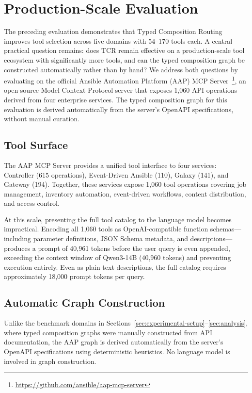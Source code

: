 \section{Production-Scale Evaluation}
\label{sec:production-eval}

The preceding evaluation demonstrates that Typed Composition Routing improves tool selection across five domains with 54--170 tools each.
A central practical question remains: does TCR remain effective on a production-scale tool ecosystem with significantly more tools, and can the typed composition graph be constructed automatically rather than by hand?
We address both questions by evaluating on the official Ansible Automation Platform (AAP) MCP Server~\footnote{\url{https://github.com/ansible/aap-mcp-server}}, an open-source Model Context Protocol server that exposes 1,060 API operations derived from four enterprise services.
The typed composition graph for this evaluation is derived automatically from the server's OpenAPI specifications, without manual curation.

\subsection{Tool Surface}
\label{sec:aap-tools}

The AAP MCP Server provides a unified tool interface to four services: Controller (615 operations), Event-Driven Ansible (110), Galaxy (141), and Gateway (194).
Together, these services expose 1,060 tool operations covering job management, inventory automation, event-driven workflows, content distribution, and access control.

At this scale, presenting the full tool catalog to the language model becomes impractical.
Encoding all 1,060 tools as OpenAI-compatible function schemas---including parameter definitions, JSON Schema metadata, and descriptions---produces a prompt of 40,961 tokens before the user query is even appended, exceeding the context window of Qwen3-14B (40,960 tokens) and preventing execution entirely.
Even as plain text descriptions, the full catalog requires approximately 18,000 prompt tokens per query.

\subsection{Automatic Graph Construction}
\label{sec:auto-graph}

Unlike the benchmark domains in Sections~\ref{sec:experimental-setup}--\ref{sec:analysis}, where typed composition graphs were manually constructed from API documentation, the AAP graph is derived automatically from the server's OpenAPI specifications using deterministic heuristics.
No language model is involved in graph construction.

